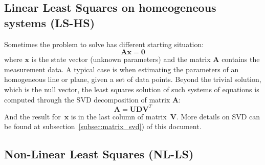 \subsection{Linear Least Squares on homeogeneous systems (LS-HS)}
\label{subsec:ls_homogeneous}
Sometimes the problem to solve has different starting situation: 
\begin{equation}
 \mathbf{A}\mathbf{x} = \mathbf{0}
\end{equation}
where $\mathbf{x}$ is the state vector (unknown parameters) and the matrix $\mathbf{A}$ contains the measurement data. A typical case is when estimating the parameters of an homogeneous line or plane, given a set of data points. Beyond the trivial solution, which is the null vector, the least squares solution of such systems of equations is computed through the SVD decomposition of matrix $\mathbf{A}$:
\begin{equation}
 \mathbf{A} = \mathbf{UDV}^T
\end{equation}
And the result for~$\mathbf{x}$ is in the last column of matrix~$\mathbf{V}$. More details on SVD can be found at subsection~\ref{subsec:matrix_svd}) of this document.










\subsection{Non-Linear Least Squares (NL-LS)}


